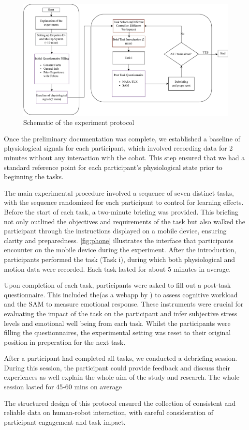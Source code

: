 \begin{figure}[h]
	\centering
	\includegraphics[width=\columnwidth]{images/expschematic.pdf}
	\caption{Schematic of the experiment protocol}
	\label{fig:prot}
\end{figure}

Once the preliminary documentation was complete, we established a baseline of physiological signals for each participant, which involved recording data for 2 minutes without any interaction with the cobot. This step ensured that we had a standard reference point for each participant's physiological state prior to beginning the tasks.

The main experimental procedure involved a sequence of seven distinct tasks, with the sequence randomized for each participant to control for learning effects.
Before the start of each task, a two-minute briefing was provided. This briefing not only outlined the objectives and requirements of the task but also walked the participant through the instructions displayed on a mobile device, ensuring clarity and preparedness. \autoref{fig:phone} illustrates the interface that participants encounter on the mobile device during the experiment. After the introduction, participants performed the task (Task i), during which both physiological and motion data were recorded. Each task lasted for about 5 minutes in average.



Upon completion of each task, participants were asked to fill out a post-task questionnaire. This included the(as a webapp by \textcite{pandian}) to assess cognitive workload and the \gls{SAM} to measure emotional response. These instruments were crucial for evaluating the impact of the task on the participant and infer subjective stress levels and emotional well being from each task. Whilst the participants were filling the questionnaires, the experimental setting was reset to their original position in preperation for the next task.

 After a participant had completed all tasks, we conducted a debriefing session. During this session, the participant could provide feedback and discuss their experiences as well explain the whole aim of the study and research. The whole session lasted for 45-60 mins on average 

The structured design of this protocol ensured the collection of consistent and reliable data on human-robot interaction, with careful consideration of participant engagement and task impact.